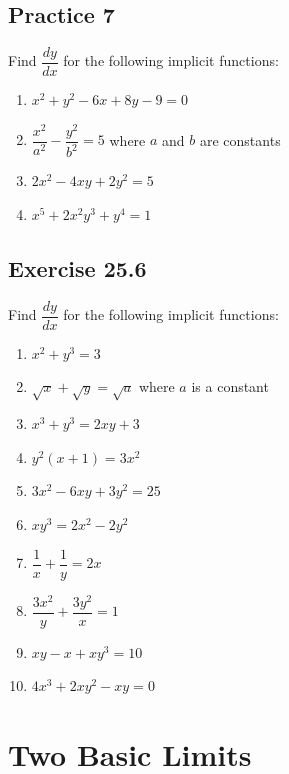 \documentclass[12pt]{report}
\begin{document}
\subsection*{Practice 7}

\noindent Find $\dfrac{dy}{dx}$ for the following implicit functions:
\setlength{\columnseprule}{1pt}
\setlength{\columnsep}{24pt}
\begin{multicols}{2}
  \begin{enumerate}
    \item $x^{2}+y^{2}-6x+8y-9=0$
    \item ${\dfrac{x^{2}}{a^{2}}}-{\dfrac{y^{2}}{b^{2}}}=5$ where $a$ and $b$ are constants
    \item $2x^{2}-4x y+2y^{2}=5$
    \item $x^{5}+2x^{2}y^{3}+y^{4}=1$
  \end{enumerate}
\end{multicols}

\subsection*{Exercise 25.6}

\noindent Find $\dfrac{dy}{dx}$ for the following implicit functions:
\setlength{\columnseprule}{1pt}
\setlength{\columnsep}{24pt}
\begin{multicols}{2}
  \begin{enumerate}
    \item $x^{2}+y^{3}=3$
    \item ${\sqrt{x}}+{\sqrt{y}}={\sqrt{a}}$ where $a$ is a constant
    \item $x^{3}+y^{3}=2x y+3$
    \item $y^{2}(x+1)=3x^{2}$
    \item $3x^{2}-6x y+3y^{2}=25$
    \item $x y^{3}=2x^{2}-2y^{2}$
    \item ${\dfrac{1}{x}}+{\dfrac{1}{y}}=2x$
    \item ${\dfrac{3x^{2}}{y}}+{\dfrac{3y^{2}}{x}}=1$
    \item $xy-x+xy^{3}=10$
    \item ${4x^{3}}+2x y^{2}-x y=0$
  \end{enumerate}
\end{multicols}

\section{Two Basic Limits}
\end{document}
